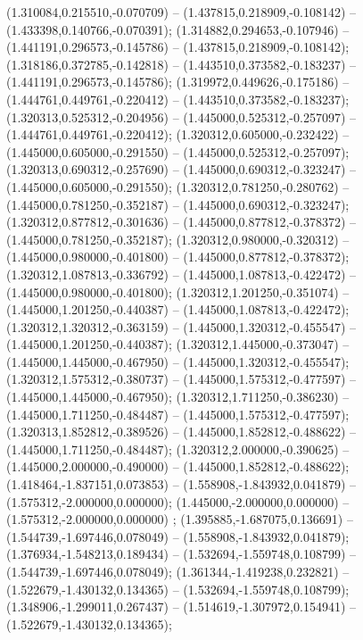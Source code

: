  (1.310084,0.215510,-0.070709) -- (1.437815,0.218909,-0.108142) -- (1.433398,0.140766,-0.070391);
 (1.314882,0.294653,-0.107946) -- (1.441191,0.296573,-0.145786) -- (1.437815,0.218909,-0.108142);
 (1.318186,0.372785,-0.142818) -- (1.443510,0.373582,-0.183237) -- (1.441191,0.296573,-0.145786);
 (1.319972,0.449626,-0.175186) -- (1.444761,0.449761,-0.220412) -- (1.443510,0.373582,-0.183237);
 (1.320313,0.525312,-0.204956) -- (1.445000,0.525312,-0.257097) -- (1.444761,0.449761,-0.220412);
 (1.320312,0.605000,-0.232422) -- (1.445000,0.605000,-0.291550) -- (1.445000,0.525312,-0.257097);
 (1.320313,0.690312,-0.257690) -- (1.445000,0.690312,-0.323247) -- (1.445000,0.605000,-0.291550);
 (1.320312,0.781250,-0.280762) -- (1.445000,0.781250,-0.352187) -- (1.445000,0.690312,-0.323247);
 (1.320312,0.877812,-0.301636) -- (1.445000,0.877812,-0.378372) -- (1.445000,0.781250,-0.352187);
 (1.320312,0.980000,-0.320312) -- (1.445000,0.980000,-0.401800) -- (1.445000,0.877812,-0.378372);
 (1.320312,1.087813,-0.336792) -- (1.445000,1.087813,-0.422472) -- (1.445000,0.980000,-0.401800);
 (1.320312,1.201250,-0.351074) -- (1.445000,1.201250,-0.440387) -- (1.445000,1.087813,-0.422472);
 (1.320312,1.320312,-0.363159) -- (1.445000,1.320312,-0.455547) -- (1.445000,1.201250,-0.440387);
 (1.320312,1.445000,-0.373047) -- (1.445000,1.445000,-0.467950) -- (1.445000,1.320312,-0.455547);
 (1.320312,1.575312,-0.380737) -- (1.445000,1.575312,-0.477597) -- (1.445000,1.445000,-0.467950);
 (1.320312,1.711250,-0.386230) -- (1.445000,1.711250,-0.484487) -- (1.445000,1.575312,-0.477597);
 (1.320313,1.852812,-0.389526) -- (1.445000,1.852812,-0.488622) -- (1.445000,1.711250,-0.484487);
 (1.320312,2.000000,-0.390625) -- (1.445000,2.000000,-0.490000) -- (1.445000,1.852812,-0.488622);
 (1.418464,-1.837151,0.073853) -- (1.558908,-1.843932,0.041879) -- (1.575312,-2.000000,0.000000);
 (1.445000,-2.000000,0.000000) -- (1.575312,-2.000000,0.000000) ;
 (1.395885,-1.687075,0.136691) -- (1.544739,-1.697446,0.078049) -- (1.558908,-1.843932,0.041879);
 (1.376934,-1.548213,0.189434) -- (1.532694,-1.559748,0.108799) -- (1.544739,-1.697446,0.078049);
 (1.361344,-1.419238,0.232821) -- (1.522679,-1.430132,0.134365) -- (1.532694,-1.559748,0.108799);
 (1.348906,-1.299011,0.267437) -- (1.514619,-1.307972,0.154941) -- (1.522679,-1.430132,0.134365);
